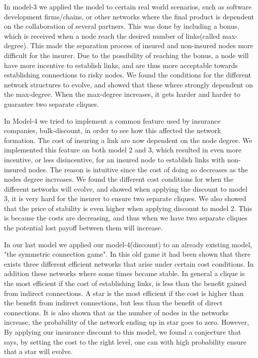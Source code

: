 In model-3 we applied the model to certain real world scenarios, such as software development firms/chains, or other networks where the final product is dependent on the collaboration of several partners.
This was done by including a bonus, which is received when a node reach the desired number of links(called max-degree). This made the separation process of insured and non-insured nodes more difficult for the insurer. Due to the possibility of reaching the bonus, a node will have more incentive to establish links, and are thus more acceptable towards establishing connections to risky nodes. We found the conditions for the different network structures to evolve, and showed that these where strongly dependent on the max-degree. When the max-degree increases, it gets harder and harder to guarantee two separate cliques.

In Model-4 we tried to implement a common feature used by insurance companies, bulk-discount, in order to see how this affected the network formation. The cost of insuring a link are now dependent on the node degree. We implemented this feature on both model 2 and 3, which resulted in even more incentive, or less disincentive, for an insured node to establish links with non-insured nodes. The reason is intuitive since the cost of doing so decreases as the nodes degree increases. 
We found the different cost conditions for when the different networks will evolve, and showed when applying the discount to model 3, it is very hard for the insurer to ensure two separate cliques. 
We also showed that the price of stability is even higher when applying discount to model 2. This is because the costs are decreasing, and thus when we have two separate cliques the potential lost payoff between them will increase. 

In our last model we applied our model-4(discount) to an already existing model, "the symmetric connection game". In this old game it had been shown that there exists three different efficient networks that arise under certain cost conditions. In addition these networks where some times became stable. In general a clique is the most efficient if the cost of establishing links, is less than the benefit gained from indirect connections. A star is the most efficient if the cost is higher than the benefit from indirect connections, but less than the benefit of direct connections. 
It is also shown that as the number of nodes in the networks increase, the probability of the network ending up in star goes to zero. However, By applying our insurance discount to this model, we found a conjecture that says, by setting the cost to the right level, one can with high probability ensure that a star will evolve. 



